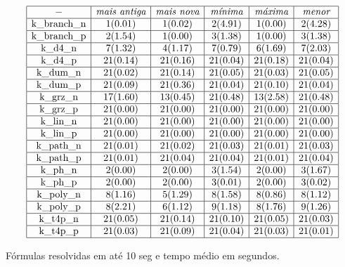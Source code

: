 \begin{table*}[t]
	\[
\begin{array}{|c|c|c|c|c|c|}
	\hline - & \textit{mais antiga} & \textit{mais nova} & \textit{mínima} & \textit{máxima} & \textit{menor} \\

	\hline \textnormal{k\_branch\_n} & 1(0.01) & 1(0.02) & 2(4.91) & 1(0.00) & 2(4.28) \\
	\hline \textnormal{k\_branch\_p} & 2(1.54) & 1(0.00) & 3(1.38) & 1(0.00) & 3(1.38) \\
	\hline \textnormal{k\_d4\_n} & 7(1.32) & 4(1.17) & 7(0.79) & 6(1.69) & 7(2.03) \\
	\hline \textnormal{k\_d4\_p} & 21(0.14) & 21(0.16) & 21(0.04) & 21(0.18) & 21(0.04) \\
	\hline \textnormal{k\_dum\_n} & 21(0.02) & 21(0.14) & 21(0.05) & 21(0.03) & 21(0.05) \\
	\hline \textnormal{k\_dum\_p} & 21(0.09) & 21(0.36) & 21(0.04) & 21(0.10) & 21(0.04) \\
	\hline \textnormal{k\_grz\_n} & 17(1.60) & 13(0.45) & 21(0.48) & 13(2.58) & 21(0.48) \\
	\hline \textnormal{k\_grz\_p} & 21(0.00) & 21(0.00) & 21(0.00) & 21(0.00) & 21(0.00) \\
	\hline \textnormal{k\_lin\_n} & 21(0.00) & 21(0.00) & 21(0.00) & 21(0.00) & 21(0.00) \\
	\hline \textnormal{k\_lin\_p} & 21(0.00) & 21(0.00) & 21(0.00) & 21(0.00) & 21(0.00) \\
	\hline \textnormal{k\_path\_n} & 21(0.01) & 21(0.02) & 21(0.03) & 21(0.01) & 21(0.03) \\
	\hline \textnormal{k\_path\_p} & 21(0.01) & 21(0.04) & 21(0.04) & 21(0.01) & 21(0.04) \\
	\hline \textnormal{k\_ph\_n} & 2(0.00) & 2(0.00) & 3(1.54) & 2(0.00) & 3(1.67) \\
	\hline \textnormal{k\_ph\_p} & 2(0.00) & 2(0.00) & 3(0.01) & 2(0.00) & 3(0.02) \\
	\hline \textnormal{k\_poly\_n} & 8(1.16) & 5(1.29) & 8(1.58) & 8(0.86) & 8(1.12) \\
	\hline \textnormal{k\_poly\_p} & 8(2.21) & 6(1.12) & 9(1.18) & 8(1.76) & 9(1.26) \\
	\hline \textnormal{k\_t4p\_n} & 21(0.05) & 21(0.14) & 21(0.10) & 21(0.05) & 21(0.03) \\
	\hline \textnormal{k\_t4p\_p} & 21(0.03) & 21(0.09) & 21(0.04) & 21(0.03) & 21(0.01) \\
	
	\hline
	
\end{array}
	\]
\caption{Fórmulas resolvidas em até 10 seg e tempo médio em segundos.}
\label{table:primeiro10}
\end{table*}

